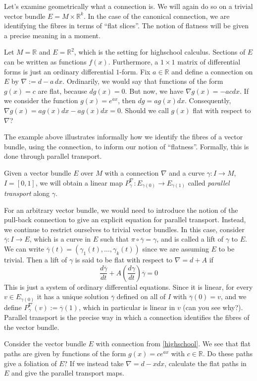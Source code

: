 Let's examine geometrically what a connection is. We will again do so on a trivial vector bundle $E=M\times\mathbb{R}^k$. In the case of the canonical connection, we are identifying the fibres in terms of ``flat slices''. The notion of flatness will be given a precise meaning in a moment.
\begin{example}\label{highschool}
  Let $M=\mathbb{R}$ and $E=\mathbb{R}^2$, which is the setting for highschool calculus. Sections of $E$ can be written as functions $f(x)$. Furthermore, a $1\times 1$ matrix of differential forms is just an ordinary differential $1$-form. Fix $a\in\mathbb{R}$ and define a connection on $E$ by $\nabla:=d-a\,dx$. Ordinarily, we would say that functions of the form $g(x)=c$ are flat, because $dg(x)=0$. But now, we have $\nabla g(x)=-acdx$. If we consider the function $g(x)=e^{ax}$, then $dg=ag(x)dx$. Consequently, $\nabla g(x)=ag(x)dx-ag(x)dx=0$. Should we call $g(x)$ flat with respect to $\nabla$?
\end{example}
The example above illustrates informally how we identify the fibres of a vector bundle, using the connection, to inform our notion of ``flatness''. Formally, this is done through parallel transport.
\begin{definition}
  Given a vector bundle $E$ over $M$ with a connection $\nabla$ and a curve $\gamma:I\to M$, $I=[0,1]$, we will obtain a linear map $P^\nabla_\gamma:E_{\gamma(0)}\to E_{\gamma(1)}$ called \emph{parallel transport} along $\gamma$.
\end{definition}
For an arbitrary vector bundle, we would need to introduce the notion of the pull-back connection to give an explicit equation for parallel transport. Instead, we continue to restrict ourselves to trivial vector bundles. In this case, consider $\overline{\gamma}:I\to E$, which is a curve in $E$ such that $\pi\circ\overline{\gamma}=\gamma$, and is called a lift of $\gamma$ to $E$. We can write $\overline{\gamma}(t)=(\gamma_1(t),\dots,\gamma_k(t))$ since we are assuming $E$ to be trivial. Then a lift of $\gamma$ is said to be flat with respect to $\nabla=d+A$ if
$$\frac{d\overline{\gamma}}{dt}+A(\frac{d\gamma}{dt})\overline{\gamma}=0$$
This is just a system of ordinary differential equations. Since it is linear, for every $v\in E_{\gamma(0)}$ it has a unique solution $\overline{\gamma}$ defined on all of $I$ with $\overline{\gamma}(0)=v$, and we define $P^\nabla_\gamma(v):=\overline{\gamma}(1)$, which in particular is linear in $v$ (can you see why?). Parallel transport is the precise way in which a connection identifies the fibres of the vector bundle.
\begin{exercise}
  Consider the vector bundle $E$ with connection from \ref{highschool}. We see that flat paths are given by functions of the form $g(x)=ce^{ax}$ with $c\in\mathbb{R}$. Do these paths give a foliation of $E$? If we instead take $\nabla=d-xdx$, calculate the flat paths in $E$ and give the parallel transport maps.
\end{exercise}

